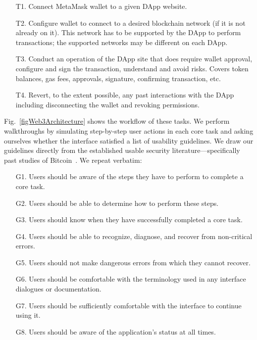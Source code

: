 \documentclass[conference]{IEEEtran}
\begin{document}
\begin{enumerate}
    \item [T1.] Connect MetaMask wallet to a given DApp website. %
    \item [T2.] Configure wallet to connect to a desired blockchain network (if it is not already on it). This network has to be supported by the DApp to perform transactions; the supported networks may be different on each DApp. %
    \item [T3.] Conduct an operation of the DApp site that does require wallet approval, configure and sign the transaction, understand and avoid risks. Covers token balances, gas fees, approvals, signature, confirming transaction, etc. %
	\item [T4.] Revert, to the extent possible, any past interactions with the DApp including disconnecting the wallet and revoking permissions.
\end{enumerate}

Fig.~\ref{figWeb3Architecture} shows the workflow of these tasks.
We perform walkthroughs by simulating step-by-step user actions in each core task and asking ourselves whether the interface satisfied a list of usability guidelines.
We draw our guidelines directly from the established usable security literature---specifically past studies of Bitcoin~\cite{eskandari2018first,moniruzzaman2020examining}. We repeat verbatim:

\begin{enumerate}
    \item[G1.] Users should be aware of the steps they have to perform to complete a core task.
    \item[G2.] Users should be able to determine how to perform these steps. %
    \item[G3.] Users should know when they have successfully completed a core task. %
    \item[G4.] Users should be able to recognize, diagnose, and recover from non-critical errors. %
    \item[G5.] Users should not make dangerous errors from which they cannot recover. %
    \item[G6.] Users should be comfortable with the terminology used in any interface dialogues or documentation.
    \item[G7.] Users should be sufficiently comfortable with the interface to continue using it.
    \item[G8.] Users should be aware of the application’s status at all times. %
\end{enumerate}
\end{document}
